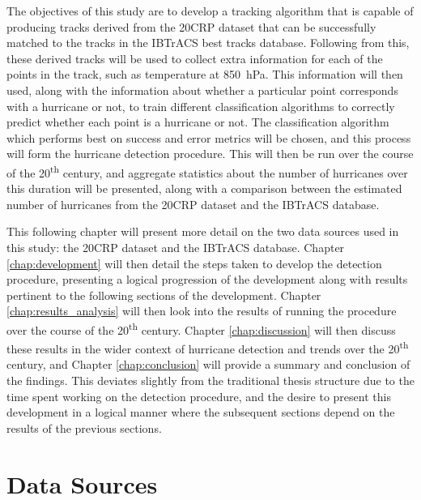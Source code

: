 \documentclass[pdftex,12pt,a4paper]{report}
\newcommand{\ts}{\textsuperscript}
\begin{document}
The objectives of this study are to develop a tracking algorithm that is capable of producing tracks
derived from the 20CRP dataset that can be successfully matched to the tracks in the IBTrACS best
tracks database. Following from this, these derived tracks will be used to collect extra information for
each of the points in the track, such as temperature at \SI{850}{hPa}. This information will then
used, along with the information about whether a particular point corresponds with a hurricane or
not, to train different classification algorithms to correctly predict whether each point is a
hurricane or not. The classification algorithm which performs best on success and error metrics will
be chosen, and this process will form the hurricane detection procedure. This will then be run
over the course of the 20\ts{th} century, and aggregate statistics about the number of hurricanes
over this duration will be presented, along with a comparison between the estimated number of
hurricanes from the 20CRP dataset and the IBTrACS database.

This following chapter will present more detail on the two data sources used in this study: the
20CRP dataset and the IBTrACS database. Chapter \ref{chap:development} will then detail the steps
taken to develop the detection procedure, presenting a logical progression of the development along
with results pertinent to the following sections of the development. Chapter
\ref{chap:results_analysis} will then look into the results of running the procedure over the course
of the 20\ts{th} century. Chapter \ref{chap:discussion} will then discuss these results in the wider
context of hurricane detection and trends over the 20\ts{th} century, and Chapter
\ref{chap:conclusion} will provide a summary and conclusion of the findings. This deviates slightly
from the traditional thesis structure due to the time spent working on the detection procedure, and
the desire to present this development in a logical manner where the subsequent sections depend on
the results of the previous sections.

\chapter{Data Sources}
\end{document}
